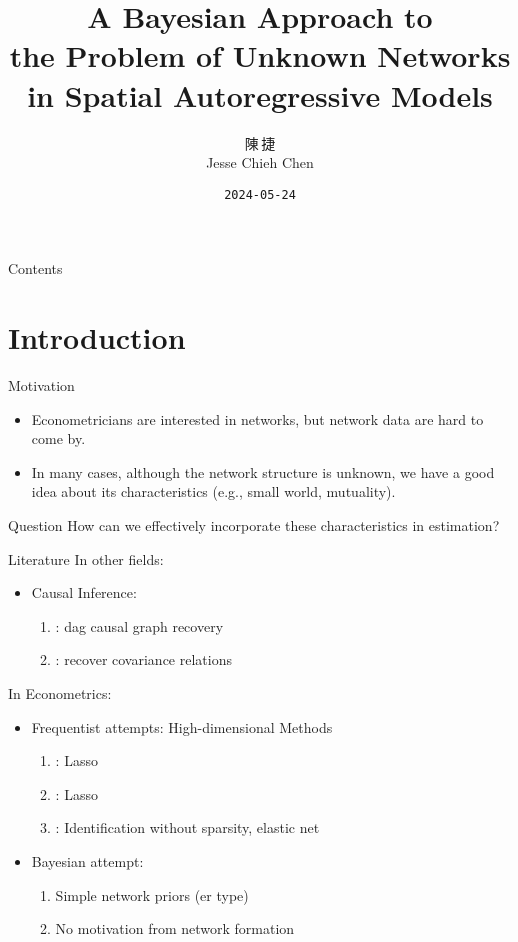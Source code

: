 \documentclass{beamer}
\title{A Bayesian Approach to\\the Problem of Unknown Networks\\in Spatial Autoregressive Models}
\author{陳\,捷\\Jesse Chieh Chen}
\date{\texttt{2024-05-24}}
\begin{document}
\maketitle

\begin{frame}{Contents}
	\tableofcontents
\end{frame}

\section{Introduction}

\begin{frame}{Motivation}
	\begin{itemize}
		\item
			Econometricians are interested in networks,
			but network data are hard to come by.
		\item
			In many cases,
			although the network structure is unknown,
			we have a good idea about its characteristics (e.g., small world, mutuality).
	\end{itemize}
	\begin{block}{Question}
		How can we effectively incorporate these characteristics in estimation?
	\end{block}
\end{frame}

\begin{frame}{Literature}
	In other fields:
	\begin{itemize}
		\item Causal Inference:
			\begin{enumerate}
				\item \cite{madigan-1994}: \acrshort{dag} causal graph recovery
				\item \cite{yuan-2007}: recover covariance relations
			\end{enumerate}
	\end{itemize}
	In Econometrics:
	\begin{itemize}
		\item Frequentist attempts: High-dimensional Methods
			\begin{enumerate}
				\item \cite{meinshausen-2006}: Lasso
				\item \cite{lam-2020}: Lasso
				\item \cite{de_paula-2023}: Identification without sparsity, elastic net
			\end{enumerate}
		\item Bayesian attempt: \cite{krisztin-piribauer-2022}
			\begin{enumerate}
				\item
					Simple network priors (\acrlong{er} type)
				\item
					No motivation from network formation
			\end{enumerate}
	\end{itemize}
\end{frame}
\end{document}
